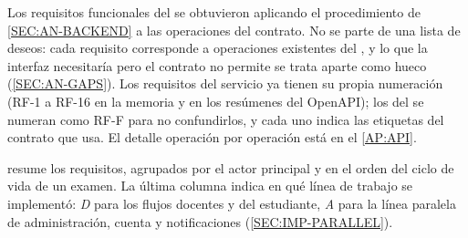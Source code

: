 Los requisitos funcionales del  se obtuvieron aplicando el procedimiento de
\cref{SEC:AN-BACKEND} a las operaciones del contrato. No se parte de una lista de deseos:
cada requisito corresponde a operaciones existentes del , y lo que la interfaz
necesitaría pero el contrato no permite se trata aparte como hueco (\cref{SEC:AN-GAPS}). Los
requisitos del servicio ya tienen su propia numeración (RF-1 a RF-16 en la memoria y en los
resúmenes del OpenAPI); los del  se numeran como RF-F para no confundirlos, y
cada uno indica las etiquetas del contrato que usa. El detalle operación por operación está en
el \cref{AP:API}.

 resume los requisitos, agrupados por el actor principal y en el orden del
ciclo de vida de un examen. La última columna indica en qué línea de trabajo se implementó:
\emph{D} para los flujos docentes y del estudiante, \emph{A} para la línea paralela de
administración, cuenta y notificaciones (\cref{SEC:IMP-PARALLEL}).

